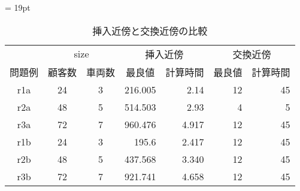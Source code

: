 \begin{table}[]
  \tabcolsep = 19pt
  \renewcommand{\arraystretch}{0.8}
  \caption{挿入近傍と交換近傍の比較}
  \label{table1}
\begin{tabular}{ccccrcr}
\hline
    & \multicolumn{2}{c}{size} & \multicolumn{2}{c}{挿入近傍}                          & \multicolumn{2}{c}{交換近傍}                         \\ \cline{2-7}
問題例 & 顧客数           &  車両数          & 最良値                      & \multicolumn{1}{c}{計算時間} & 最良値                      & \multicolumn{1}{c}{計算時間} \\ \cline{2-7}
r1a & 24          & 3          & \multicolumn{1}{r}{216.005} & 2.14                     & \multicolumn{1}{r}{12} & 45                     \\
r2a & 48          & 5          & \multicolumn{1}{r}{514.503}  & 2.93                      & \multicolumn{1}{r}{4}  & 5                      \\
r3a & 72         & 7          & \multicolumn{1}{r}{960.476} & 4.917                     & \multicolumn{1}{r}{12} & 45                     \\
r1b & 24          & 3          & \multicolumn{1}{r}{195.6} & 2.417                     & \multicolumn{1}{r}{12} & 45                     \\
r2b & 48          & 5          & \multicolumn{1}{r}{437.568} & 3.340                     & \multicolumn{1}{r}{12} & 45                     \\
r3b & 72         & 7          & \multicolumn{1}{r}{921.741} & 4.658                   & \multicolumn{1}{r}{12} & 45                     \\
\hline
\end{tabular}
\end{table}




